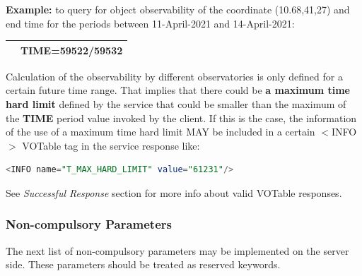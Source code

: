 \documentclass[11pt,a4paper]{ivoatex/ivoa}
\begin{document}
\begin{itemize}
{\textbf{Example:} to query for object observability of the coordinate
(10.68,41,27) and end time for the periods between 11-April-2021 and 
14-April-2021:
\begin{table}[h]
\centering
\begin{tabular}{|l|l|}
\hline
\begin{lstlisting}[language=SQL]
http://xmmvischeck.esac.esa.int:8080/objobssap/query?
POS=10.68,41.27&TIME=59522/59532
\end{lstlisting}
\\
\hline
\end{tabular}
\end{table}

Calculation of the observability by different observatories is only defined
for a certain future time range. That implies that there could be
\textbf{a maximum time hard limit} defined by the service that could be
smaller than the maximum of the \textbf{TIME} period value invoked by
the client. If this is the case, the information of the use of a maximum
time hard limit MAY be included in a certain $<$INFO$>$ VOTable tag in 
the service response like:
\begin{lstlisting}[language=SQL]
<INFO name="T_MAX_HARD_LIMIT" value="61231"/>
\end{lstlisting}
}
\end{itemize}

See \textit{Successful Response} section for more info about valid
VOTable res\-pon\-ses.

\subsubsection{Non-compulsory Parameters}
The next list of non-compulsory parameters may be implemented on the
server side. These parameters should be treated as reserved keywords.
\end{document}
